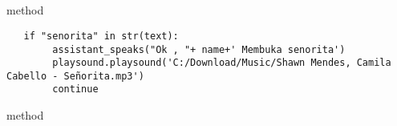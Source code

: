 \\
\\
\\
\\
\\
\\
\\
\\
\\
\\
\\
\\
\\
\\
\\
\\
\\
\\
\\
\\
\\
\\
\\
\\
 method 
\begin{lstlisting}
   if "senorita" in str(text):
        assistant_speaks("Ok , "+ name+' Membuka senorita')
        playsound.playsound('C:/Download/Music/Shawn Mendes, Camila Cabello - Señorita.mp3')
        continue
\end{lstlisting}
 method 
\\
\\
\\
\\
\\
\\
\\
\\
\\
\\
\\
\\
\\
\\
\\
\\
\\
\\
\\
\\
\\
\\
\\
\\
\\
\\
\\
\\
\\
